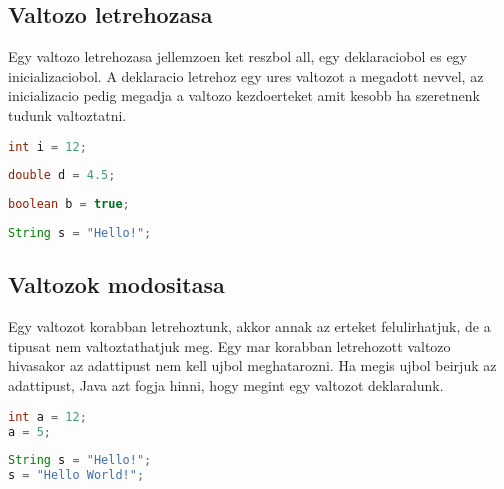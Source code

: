 \documentclass{article}
\begin{document}
\subsection{Valtozo letrehozasa}

Egy valtozo letrehozasa jellemzoen ket reszbol all, egy deklaraciobol es egy inicializaciobol. A deklaracio letrehoz egy ures valtozot a megadott nevvel, az inicializacio pedig megadja a valtozo kezdoerteket amit kesobb ha szeretnenk tudunk valtoztatni.

\begin{lstlisting}[language=Java, caption=Int valtozo deklaralasa inicializacioval. Ennek a valtozonak 12 a kezdoerteke]
int i = 12;
\end{lstlisting}

\begin{lstlisting}[language=Java, caption=Double valtozo deklaralasa inicializacioval. Ennek a valtozonak 4.5 a kezdoerteke]
double d = 4.5;
\end{lstlisting}

\newpage

\begin{lstlisting}[language=Java, caption=Boolean valtozo deklaralasa inicializacioval. Ennek a valtozonak true a  kezdoerteke]
boolean b = true;
\end{lstlisting}

\begin{lstlisting}[language=Java, caption=String valtozo deklaralasa inicializacioval. Ennek a valtozonak "Hello!" lesz a kezdoerteke]
String s = "Hello!";
\end{lstlisting}

\subsection{Valtozok modositasa}

Egy valtozot korabban letrehoztunk, akkor annak az erteket felulirhatjuk, de a tipusat nem valtoztathatjuk meg. Egy mar korabban letrehozott valtozo hivasakor az adattipust nem kell ujbol meghatarozni. Ha megis ujbol beirjuk az adattipust, Java azt fogja hinni, hogy megint egy valtozot deklaralunk.

\begin{lstlisting}[language=Java, caption=Egy 12 kezdoerteku int valtozot modositunk.]
int a = 12;
a = 5;
\end{lstlisting}

\begin{lstlisting}[language=Java, caption=Egy "Hello" kezdoerteku String valtozot modositunk.]
String s = "Hello!";
s = "Hello World!";
\end{lstlisting}
\end{document}
